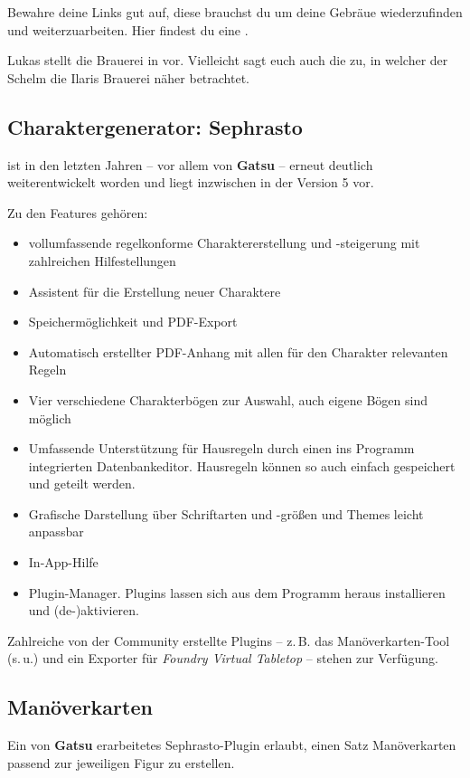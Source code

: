 Bewahre deine Links gut auf, diese brauchst du um deine Gebräue wiederzufinden und weiterzuarbeiten. Hier findest du eine .

Lukas stellt die Brauerei in  vor. Vielleicht sagt euch auch die  zu, in welcher der Schelm die Ilaris Brauerei näher betrachtet.


\subsection*{Charaktergenerator: Sephrasto}
 ist in den letzten Jahren
-- vor allem von \textbf{Gatsu} --
erneut deutlich weiterentwickelt worden und liegt inzwischen in der Version 5 vor.

Zu den Features gehören:
\begin{itemize}
	\item vollumfassende regelkonforme Charaktererstellung und -steigerung mit zahlreichen Hilfestellungen
	\item 	Assistent für die Erstellung neuer Charaktere
	\item	Speichermöglichkeit und PDF-Export
	\item	Automatisch erstellter PDF-Anhang mit allen für den Charakter relevanten Regeln
	\item	Vier verschiedene Charakterbögen zur Auswahl, auch eigene Bögen sind möglich
	\item	Umfassende Unterstützung für Hausregeln durch einen ins Programm integrierten Datenbankeditor. Hausregeln können so auch einfach gespeichert und geteilt werden.
	\item	Grafische Darstellung über Schriftarten und -größen und Themes leicht anpassbar
	\item	In-App-Hilfe
	\item	Plugin-Manager. Plugins lassen sich aus dem Programm heraus installieren und (de-)aktivieren.
\end{itemize}

Zahlreiche von der Community erstellte Plugins -- z.\,B. das Manöverkarten-Tool (s.\,u.) und ein Exporter für \emph{Foundry Virtual Tabletop} -- stehen zur Verfügung.


\subsection*{Manöverkarten}
Ein von \textbf{Gatsu} erarbeitetes Sephrasto-Plugin erlaubt, einen Satz Manöverkarten passend zur jeweiligen Figur zu erstellen.

